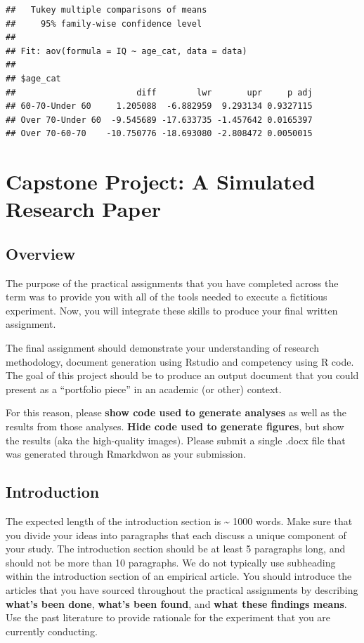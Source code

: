 \documentclass[
]{book}
\begin{document}
\begin{verbatim}
##   Tukey multiple comparisons of means
##     95% family-wise confidence level
## 
## Fit: aov(formula = IQ ~ age_cat, data = data)
## 
## $age_cat
##                        diff        lwr       upr     p adj
## 60-70-Under 60     1.205088  -6.882959  9.293134 0.9327115
## Over 70-Under 60  -9.545689 -17.633735 -1.457642 0.0165397
## Over 70-60-70    -10.750776 -18.693080 -2.808472 0.0050015
\end{verbatim}

\chapter*{Capstone Project: A Simulated Research Paper}\label{capstone-project-a-simulated-research-paper}

\section*{Overview}\label{overview-1}

The purpose of the practical assignments that you have completed across the term was to provide you with all of the tools needed to execute a fictitious experiment. Now, you will integrate these skills to produce your final written assignment.

The final assignment should demonstrate your understanding of research methodology, document generation using Rstudio and competency using R code. The goal of this project should be to produce an output document that you could present as a ``portfolio piece'' in an academic (or other) context.

For this reason, please \textbf{show code used to generate analyses} as well as the results from those analyses. \textbf{Hide code used to generate figures}, but show the results (aka the high-quality images). Please submit a single .docx file that was generated through Rmarkdwon as your submission.

\section*{Introduction}\label{introduction}

The expected length of the introduction section is \textasciitilde{} 1000 words. Make sure that you divide your ideas into paragraphs that each discuss a unique component of your study. The introduction section should be at least 5 paragraphs long, and should not be more than 10 paragraphs. We do not typically use subheading within the introduction section of an empirical article. You should introduce the articles that you have sourced throughout the practical assignments by describing \textbf{what's been done}, \textbf{what's been found}, and \textbf{what these findings means}. Use the past literature to provide rationale for the experiment that you are currently conducting.
\end{document}
